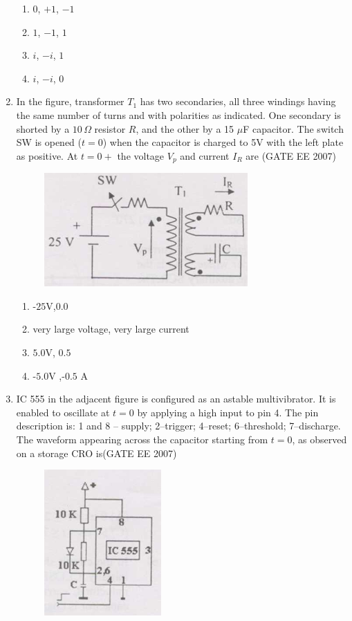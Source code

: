\documentclass[a4paper,10pt]{exam}
\theoremstyle{remark}
\begin{document}
\begin{enumerate}
\begin{enumerate}
    \item $0$, $+1$, $-1$
    \item $1$, $-1$, $1$
    \item $i$, $-i$, $1$
    \item $i$, $-i$, $0$
\end{enumerate}

\vfill
{}
\newpage

\item  \quad In the figure, transformer $T_1$ has two secondaries, all three windings having the same number of turns and with polarities as indicated. One secondary is shorted by a $10\,\Omega$ resistor $R$, and the other by a 15 $\mu$F capacitor. The switch SW is opened ($t=0$) when the capacitor is charged to 5V with the left plate as positive. At $t=0+$ the voltage $V_p$ and current $I_R$ are
\hfill{(GATE EE 2007)} 

\begin{figure}[H]
    \centering
    \includegraphics[width=0.5\linewidth]{figs/Q 57 2007.png}
\end{figure}

\begin{multicols}{2}
\begin{enumerate}
\item  -$25$V,$0.0$ 
\item  very large voltage, very large current
\item   $5.0$V, $0.5$
\item  -$5.0$V ,-$0.5$ A
\end{enumerate}
\end{multicols}
\vspace{0.5cm}
\item  \quad IC 555 in the adjacent figure is configured as an astable multivibrator. It is enabled to oscillate at $t=0$ by applying a high input to pin 4. The pin description is: 1 and 8 -- supply; 2--trigger; 4--reset; 6--threshold; 7--discharge. The waveform appearing across the capacitor starting from $t=0$, as observed on a storage CRO is\hfill{(GATE EE 2007)} 
\begin{figure}[H]
    \centering
    \includegraphics[width=0.2\linewidth]{figs/Q 58(Q).png}
\end{figure}


\end{enumerate}
\end{document}

